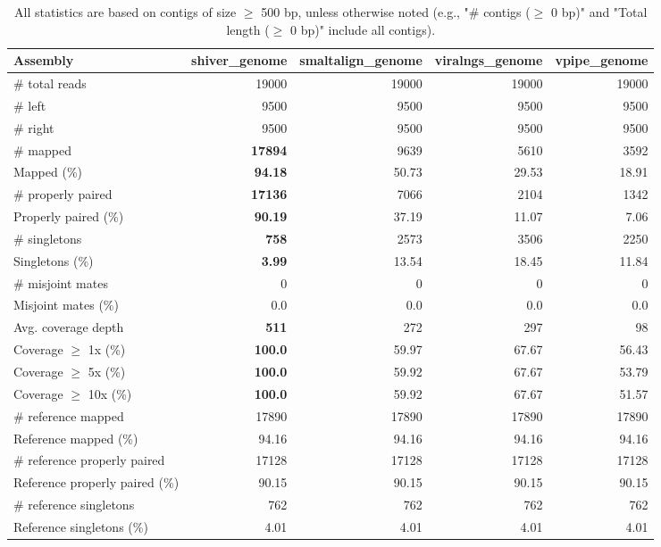 \documentclass[12pt,a4paper]{article}
\begin{document}
\begin{table}[ht]
\begin{center}
\caption{All statistics are based on contigs of size $\geq$ 500 bp, unless otherwise noted (e.g., "\# contigs ($\geq$ 0 bp)" and "Total length ($\geq$ 0 bp)" include all contigs).}
\begin{tabular}{|l*{4}{|r}|}
\hline
Assembly & shiver\_genome & smaltalign\_genome & viralngs\_genome & vpipe\_genome \\ \hline
\# total reads & 19000 & 19000 & 19000 & 19000 \\ \hline
\# left & 9500 & 9500 & 9500 & 9500 \\ \hline
\# right & 9500 & 9500 & 9500 & 9500 \\ \hline
\# mapped & {\bf 17894} & 9639 & 5610 & 3592 \\ \hline
Mapped (\%) & {\bf 94.18} & 50.73 & 29.53 & 18.91 \\ \hline
\# properly paired & {\bf 17136} & 7066 & 2104 & 1342 \\ \hline
Properly paired (\%) & {\bf 90.19} & 37.19 & 11.07 & 7.06 \\ \hline
\# singletons & {\bf 758} & 2573 & 3506 & 2250 \\ \hline
Singletons (\%) & {\bf 3.99} & 13.54 & 18.45 & 11.84 \\ \hline
\# misjoint mates & 0 & 0 & 0 & 0 \\ \hline
Misjoint mates (\%) & 0.0 & 0.0 & 0.0 & 0.0 \\ \hline
Avg. coverage depth & {\bf 511} & 272 & 297 & 98 \\ \hline
Coverage $\geq$ 1x (\%) & {\bf 100.0} & 59.97 & 67.67 & 56.43 \\ \hline
Coverage $\geq$ 5x (\%) & {\bf 100.0} & 59.92 & 67.67 & 53.79 \\ \hline
Coverage $\geq$ 10x (\%) & {\bf 100.0} & 59.92 & 67.67 & 51.57 \\ \hline
\# reference mapped & 17890 & 17890 & 17890 & 17890 \\ \hline
Reference mapped (\%) & 94.16 & 94.16 & 94.16 & 94.16 \\ \hline
\# reference properly paired & 17128 & 17128 & 17128 & 17128 \\ \hline
Reference properly paired (\%) & 90.15 & 90.15 & 90.15 & 90.15 \\ \hline
\# reference singletons & 762 & 762 & 762 & 762 \\ \hline
Reference singletons (\%) & 4.01 & 4.01 & 4.01 & 4.01 \\ \hline

\end{tabular}
\end{center}
\end{table}
\end{document}
